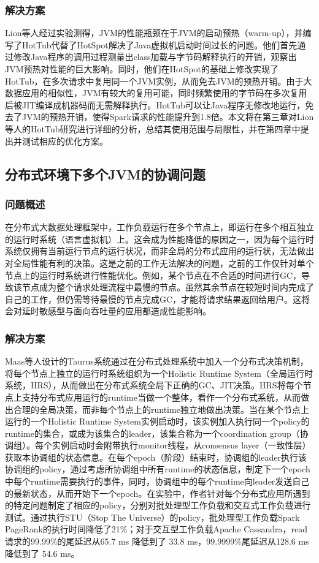 \documentclass[lang=cn,12pt,a4paper,cite=authoryear]{elegantpaper}
\begin{document}
\subsubsection{解决方案}
Lion等人经过实验测得，JVM的性能瓶颈在于JVM的启动预热（warm-up），并编写了HotTub代替了HotSpot\cite{DBLP:conf/osdi/LionCSZGY16}解决了Java虚拟机启动时间过长的问题。他们首先通过修改Java程序的调用过程测量出class加载与字节码解释执行的开销，观察出JVM预热对性能的巨大影响。同时，他们在HotSpot的基础上修改实现了HotTub，在多次请求中复用同一个JVM实例，从而免去JVM的预热开销。由于大数据应用的相似性，JVM有较大的复用可能，同时频繁使用的字节码在多次复用后被JIT编译成机器码而无需解释执行。HotTub可以让Java程序无修改地运行，免去了JVM的预热开销，使得Spark请求的性能提升到1.8倍。本文将在第三章对Lion等人的HotTub研究进行详细的分析，总结其使用范围与局限性，并在第四章中提出并测试相应的优化方案。

\subsection{分布式环境下多个JVM的协调问题}
\subsubsection{问题概述}
在分布式大数据处理框架中，工作负载运行在多个节点上，即运行在多个相互独立的运行时系统（语言虚拟机）上。这会成为性能降低的原因之一，因为每个运行时系统仅拥有当前运行节点的运行状况，而非全局的分布式应用的运行状，无法做出对全局性能有利的决策。这是之前的工作无法解决的问题，之前的工作仅针对单个节点上的运行时系统进行性能优化。例如，某个节点在不合适的时间进行GC，导致该节点成为整个请求处理流程中最慢的节点。虽然其余节点在较短时间内完成了自己的工作，但仍需等待最慢的节点完成GC，才能将请求结果返回给用户。这将会对延时敏感型与面向吞吐量的应用都造成性能影响。

\subsubsection{解决方案}
Maas等人设计的Taurus\cite{DBLP:conf/asplos/MaasA0K16}系统通过在分布式处理系统中加入一个分布式决策机制，将每个节点上独立的运行时系统组织为一个Holistic Runtime System（全局运行时系统，HRS），从而做出在分布式系统全局下正确的GC、JIT决策。HRS将每个节点上支持分布式应用运行的runtime当做一个整体，看作一个分布式系统，从而做出合理的全局决策，而非每个节点上的runtime独立地做出决策。当在某个节点上运行的一个Holistic Runtime System实例启动时，该实例加入执行同一个policy的runtime的集合，或成为该集合的leader，该集合称为一个coordination group（协调组）。每个实例启动时会附带执行monitor线程，从consensus layer（一致性层）获取本协调组的状态信息。在每个epoch（阶段）结束时，协调组的leader执行该协调组的policy，通过考虑所协调组中所有runtime的状态信息，制定下一个epoch中每个runtime需要执行的事件，同时，协调组中的每个runtime向leader发送自己的最新状态，从而开始下一个epoch。在实验中，作者针对每个分布式应用所遇到的特定问题制定了相应的policy，分别对批处理型工作负载和交互式工作负载进行测试。通过执行STU（Stop The Universe）的policy，批处理型工作负载Spark PageRank的执行时间降低了21\%；对于交互型工作负载Apache Cassandra，read请求的99.99\%的尾延迟从65.7 ms 降低到了 33.8 ms，99.9999\%尾延迟从128.6 ms 降低到了 54.6 ms。
\end{document}
